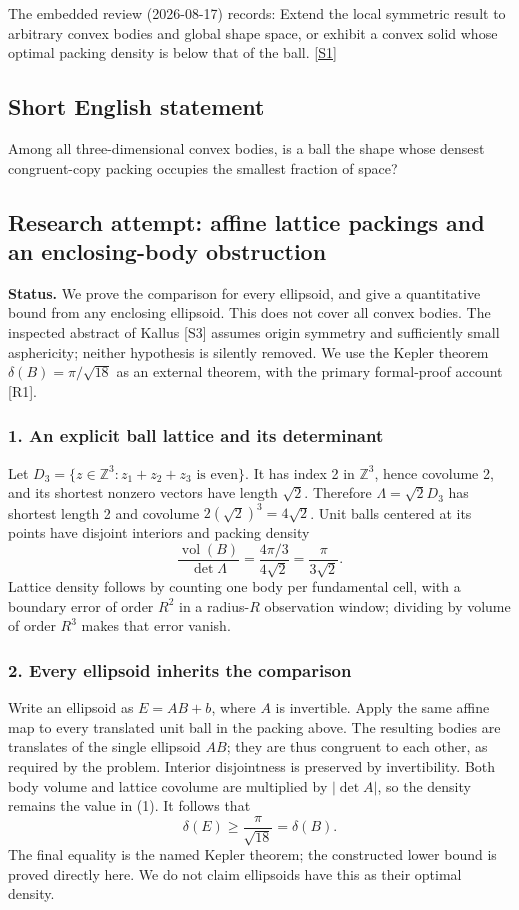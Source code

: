 \documentclass[11pt,a4paper]{article}
\newcommand{\sref}[2]{\hyperlink{source:#1:#2}{[S#2]}}
\begin{document}
The embedded review (2026-08-17) records: Extend the local symmetric result to arbitrary convex bodies and global shape space, or exhibit a convex solid whose optimal packing density is below that of the ball. \sref{statement}{1}

\subsection{Short English statement}

Among all three-dimensional convex bodies, is a ball the shape whose densest congruent-copy packing occupies the smallest fraction of space?

\subsection{Research attempt: affine lattice packings and an enclosing-body obstruction}
\textbf{Status.} We prove the comparison for every ellipsoid, and give a quantitative bound from any enclosing ellipsoid. This does not cover all convex bodies. The inspected abstract of Kallus [S3] assumes origin symmetry and sufficiently small asphericity; neither hypothesis is silently removed. We use the Kepler theorem $\delta(B)=\pi/\sqrt{18}$ as an external theorem, with the primary formal-proof account [R1].

\subsubsection{1. An explicit ball lattice and its determinant}
Let $D_3=\{z\in\mathbb Z^3:z_1+z_2+z_3\text{ is even}\}$. It has index 2 in $\mathbb Z^3$, hence covolume 2, and its shortest nonzero vectors have length $\sqrt2$. Therefore $\Lambda=\sqrt2D_3$ has shortest length 2 and covolume $2(\sqrt2)^3=4\sqrt2$. Unit balls centered at its points have disjoint interiors and packing density
\[\frac{\operatorname{vol}(B)}{\det\Lambda}
=\frac{4\pi/3}{4\sqrt2}=\frac\pi{3\sqrt2}.\tag{1}\]
Lattice density follows by counting one body per fundamental cell, with a boundary error of order $R^2$ in a radius-$R$ observation window; dividing by volume of order $R^3$ makes that error vanish.

\subsubsection{2. Every ellipsoid inherits the comparison}
Write an ellipsoid as $E=AB+b$, where $A$ is invertible. Apply the same affine map to every translated unit ball in the packing above. The resulting bodies are translates of the single ellipsoid $AB$; they are thus congruent to each other, as required by the problem. Interior disjointness is preserved by invertibility. Both body volume and lattice covolume are multiplied by $|\det A|$, so the density remains the value in (1). It follows that
\[\delta(E)\geq\frac\pi{\sqrt{18}}=\delta(B).\tag{2}\]
The final equality is the named Kepler theorem; the constructed lower bound is proved directly here. We do not claim ellipsoids have this as their optimal density.
\end{document}
